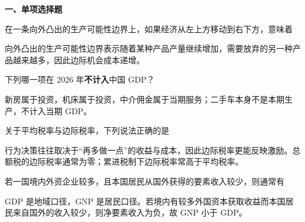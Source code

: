 ﻿


\textbf{一、单项选择题}

\begin{question}
在一条向外凸出的生产可能性边界上，如果经济从左上方移动到右下方，意味着
\begin{choiceoptions}[2]
\end{choiceoptions}
\begin{solution}
向外凸出的生产可能性边界表示随着某种产品产量继续增加，需要放弃的另一种产品越来越多，因此边际机会成本递增。
\end{solution}
\end{question}

\begin{question}
下列哪一项在 2026 年\textbf{不计入}中国 GDP？
\begin{choiceoptions}[2]
\end{choiceoptions}
\begin{solution}
新房属于投资，机床属于投资，中介佣金属于当期服务；二手车本身不是本期生产，不计入当期 GDP。
\end{solution}
\end{question}

\begin{question}
关于平均税率与边际税率，下列说法正确的是
\begin{choiceoptions}[2]
\end{choiceoptions}
\begin{solution}
行为决策往往取决于“再多做一点”的收益与成本，因此边际税率更能反映激励。总额税的边际税率通常为零；累进税制下边际税率常高于平均税率。
\end{solution}
\end{question}

\begin{question}
若一国境内外资企业较多，且本国居民从国外获得的要素收入较少，则通常有
\begin{choiceoptions}[2]
\end{choiceoptions}
\begin{solution}
GDP 是地域口径，GNP 是居民口径。若境内有较多外国资本获取收益而本国居民来自国外的收入较少，则净要素收入为负，故 GNP 小于 GDP。
\end{solution}
\end{question}


